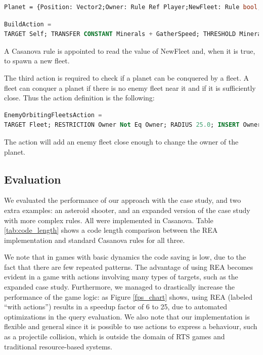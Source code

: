 \begin{lstlisting}[language=Caml]
Planet = {Position: Vector2;Owner: Rule Ref Player;NewFleet: Rule bool;BuildAction:BuildAction;EnemyOrbitingFleetsAction : EnemyOrbitingFleetsAction;GatherSpeed: float32;Minerals: Var float32 }
\end{lstlisting}

\begin{lstlisting}[language=sql]
BuildAction =
TARGET Self; TRANSFER CONSTANT Minerals + GatherSpeed; THRESHOLD Minerals 10.0; OUTPUT NewFleet := true; OUTPUT Minerals := 0.0
\end{lstlisting}

A Casanova rule is appointed to read the value of NewFleet and, when it is true, to spawn a new fleet.

The third action is required to check if a planet can be conquered by a fleet. A fleet can conquer a planet if there is no enemy fleet near it and if it is sufficiently close. Thus the action definition is the following:

\begin{lstlisting}[language=sql]
EnemyOrbitingFleetsAction =
TARGET Fleet; RESTRICTION Owner Not Eq Owner; RADIUS 25.0; INSERT Owner -> EnemyOrbitingFleets
\end{lstlisting}

The action will add an enemy fleet close enough to change the owner of the planet.


\subsection{Evaluation}

We evaluated the performance of our approach with the case study, and two extra examples: an asteroid shooter, and an expanded version of the case study with more complex rules. All were implemented in Casanova. Table \ref{tab:code_length} shows a code length comparison between the REA implementation and standard Casanova rules for all three.

We note that in games with basic dynamics the code saving is low, due to the fact that there are few repeated patterns. The advantage of using REA becomes evident in a game with actions involving many types of targets, such as the expanded case study. Furthermore, we managed to drastically increase the performance of the game logic: as Figure \ref{fps_chart} shows, using REA (labeled ``with actions'') results in a speedup factor of 6 to 25, due to automated optimizations in the query evaluation. We also note that our implementation is flexible and general since it is possible to use actions to express a behaviour, such as a projectile collision, which is outside the domain of RTS games and traditional resource-based systems.

